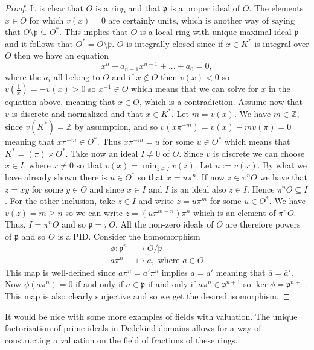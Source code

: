 \documentclass{article}
\newcommand{\mfrak}[1]{\mathfrak{#1}}
\newcommand{\mbb}[1]{\mathbb{#1}}
\numberwithin{equation}{section}
\begin{document}
\begin{proof}
	It is clear that $O$ is a ring and that $\mfrak p$ is a proper ideal of $O$. The elements $x \in O$ for which $v(x) = 0$ are certainly units, which is another way of saying that
	$O \setminus \mfrak p \subseteq  O^*$. This implies that $O$ is a local ring with unique maximal ideal $\mfrak p$ and it follows that $O^* = O \setminus \mfrak p$. $O$ is integrally closed since if $x \in K^*$ is integral over $O$ then we have an equation
	$$x^n + a_{n-1}x^{n-1} + ... + a_0 = 0,$$
	where the $a_i$ all belong to $O$ and if $x \notin O$ then $v(x) < 0$ so $v(\frac{1}{x}) = -v(x) > 0$ so $x^{-1} \in O$ which means that we can solve for $x$ in the equation above, meaning that $x \in O$, which is a contradiction.
	Assume now that $v$ is discrete and normalized and that $x \in K^*$. Let $m = v(x)$. We have $m \in \mbb Z$, since $v(K^*) = \mbb Z$ by assumption, and so $v(x \pi^{-m}) = v(x) - mv(\pi) = 0$ meaning that $x \pi^{-m} \in O^*$. Thus $x \pi^{-m} = u$ for some $u \in O^*$ which means that $K^* = (\pi) \times O^*$. Take now an ideal $I \neq 0$ of $O$. Since $v$ is discrete we can choose $x \in I$, where $x \neq 0$ so that $v(x) = \min_{z \in I}v(z)$. Let $n := v(x)$. By what we have already shown there is $u \in O^*$ so that $x = u\pi^n$. If now $z \in \pi^n O$ we have that $z = xy$ for some $y \in O$ and since $x \in I$ and $I$ is an ideal also $z \in I$. Hence $\pi^n O \subseteq I$. For the other inclusion, take $z \in I$ and write $z = u \pi^m$ for some $u \in O^*$. We have $v(z) = m \geq n$ so we can write $z = (u \pi^{m-n}) \pi^n$ which is an element of $\pi^n O$. Thus, $I = \pi^n O$ and so $\mfrak p = \pi O$. All the non-zero ideals of $O$ are therefore powers of $\mfrak p$ and so $O$ is a PID. Consider the homomorphism
	\begin{align*}
    	\phi : \mfrak p^n & \to O / \mfrak p                          	\\
    	a \pi^n       	& \mapsto \overline a, \text{ where } a \in O
	\end{align*}
	This map is well-defined since $a \pi^n = a' \pi^n$ implies $a = a'$ meaning that $\overline a = \overline a'$. Now $\phi(a \pi^n) = 0$ if and only if $a \in \mfrak p$ if and only if $a \pi^n \in \mfrak p^{n+1}$ so $\ker \phi = \mfrak p^{n+1}$. This map is also clearly surjective and so we get the desired isomorphism.
\end{proof}

It would be nice with some more examples of fields with valuation. The unique factorization of prime ideals in Dedekind domains allows for a way of constructing a valuation on the field of fractions of these rings.
\end{document}
